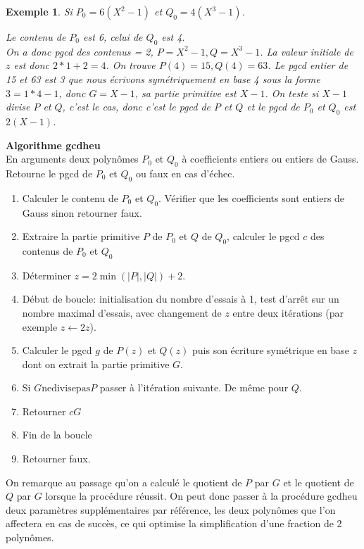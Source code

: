 \documentclass[a4paper,11pt]{article}
\newtheorem{example}[thm]{Exemple}
\begin{document}
\begin{example}
  Si $P_0 = 6 ( X^2 - 1 )$ et $Q_0 = 4 ( X^3 - 1 )$.
  
  Le contenu de $P_0$ est 6, celui de $Q_0$ est 4.\\
  On a donc pgcd des contenus = 2, $P = X^2 - 1, Q = X^3 - 1$. La valeur
  initiale de $z$ est donc $2 \ast 1 + 2 = 4$. On trouve $P ( 4 ) = 15, Q ( 4
  ) = 63$. Le pgcd entier de 15 et 63 est 3 que nous écrivons symétriquement
  en base 4 sous la forme $3 = 1 \ast 4 - 1$, donc $G = X - 1$, sa partie
  primitive est $X - 1$. On teste si $X - 1$ divise $P$ et $Q$, c'est le cas,
  donc c'est le pgcd de $P$ et $Q$ et le pgcd de $P_0$ et $Q_0$ est $2 ( X - 1
  )$.
\end{example}

{\bf Algorithme gcdheu}\\
En arguments deux polynômes $P_0$ et $Q_0$ à coefficients entiers ou entiers
de Gauss. Retourne le pgcd de 
$P_0$ et $Q_0$ ou faux en cas d'échec.
\begin{enumerate}
  \item Calculer le contenu de $P_0$ et $Q_0$. Vérifier que les coefficients
  sont entiers de Gauss sinon retourner faux.
  
  \item Extraire la partie primitive $P$ de $P_0$ et $Q$ de $Q_0$, calculer le
  pgcd $c$ des contenus de $P_0$ et $Q_0$
  
  \item Déterminer $z = 2 \min ( | P |, | Q | ) + 2$.
  
  \item Début de boucle: initialisation du nombre d'essais à 1, test d'arrêt
  sur un nombre maximal d'essais, avec changement de $z$ entre deux itérations
  (par exemple $z \leftarrow 2 z$).
  
  \item Calculer le pgcd $g$ de $P ( z )$ et $Q ( z )$ puis son écriture
  symétrique en base $z$ dont on extrait la partie primitive $G$.
  
  \item Si $G \mbox{ne} \mbox{divise} \mbox{pas}$$P$ passer à l'itération
  suivante. De même pour $Q$.
  
  \item Retourner $c G$
  
  \item Fin de la boucle
  
  \item Retourner faux.
\end{enumerate}
On remarque au passage qu'on a calculé le quotient de $P$ par $G$ et le
quotient de $Q$ par $G$ lorsque la procédure réussit. On peut donc passer à la
procédure gcdheu deux paramètres supplémentaires par référence, les deux
polynômes que l'on affectera en cas de succès, ce qui optimise la
simplification d'une fraction de 2 polynômes.
\end{document}
